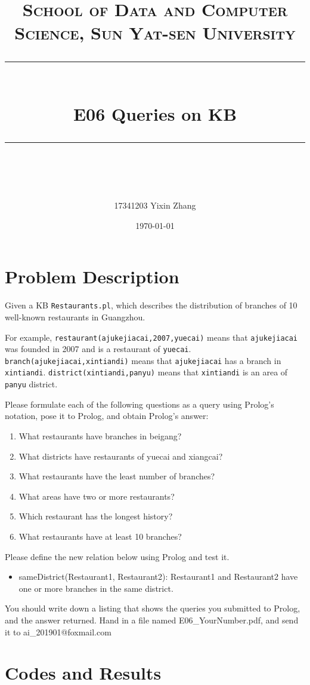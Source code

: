 ﻿\documentclass[a4paper, 11pt]{article}
\title{	
\normalfont \normalsize
\textsc{School of Data and Computer Science, Sun Yat-sen University} \\ [25pt] %
\rule{\textwidth}{0.5pt} \\[0.4cm] %
\huge  E06 Queries on KB \\ %
\rule{\textwidth}{2pt} \\[0.5cm] %
\author{17341203 Yixin Zhang}
\date{\normalsize\today}
}
\begin{document}
\maketitle
\tableofcontents
\newpage


\section{Problem Description}
Given a KB \texttt{Restaurants.pl}, which describes the distribution of branches of 10 well-known restaurants in Guangzhou. 

For example, \texttt{restaurant(ajukejiacai,2007,yuecai)} means that \texttt{ajukejiacai} was founded in 2007 and is a restaurant of \texttt{yuecai}. \texttt{branch(ajukejiacai,xintiandi)} means that \texttt{ajukejiacai} has a branch in \texttt{xintiandi}. \texttt{district(xintiandi,panyu)} means that \texttt{xintiandi} is an area of \texttt{panyu} district.

Please formulate each of the following questions as a query using Prolog's notation, pose it to Prolog, and obtain Prolog's answer:
\begin{enumerate}
  \item What restaurants have branches in beigang? 
  \item What districts have restaurants of yuecai and xiangcai?
  \item What restaurants have the least number of branches?
  \item What areas have two or more restaurants?
\item Which restaurant has the longest history?
\item What restaurants have at least 10 branches?
\end{enumerate}
Please define the new relation below using Prolog and test it.
\begin{itemize}
\item sameDistrict(Restaurant1, Restaurant2): Restaurant1 and Restaurant2 have one or more branches in the same district.
\end{itemize}




You should write down a listing that shows the queries you submitted to Prolog, and the answer returned. Hand in a file named \textsf{E06\_YourNumber.pdf}, and send it to \textsf{ai\_201901@foxmail.com}


\section{Codes and Results}
\end{document}
